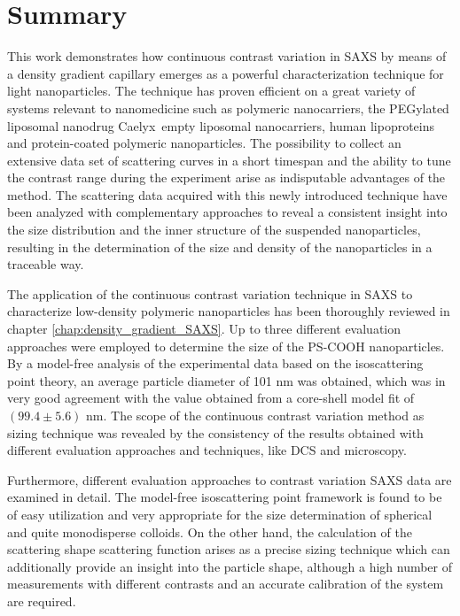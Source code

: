 \chapter{Summary} 
\label{chap:conclusions}
This work demonstrates how continuous contrast variation in SAXS by means of a density gradient capillary emerges as a powerful characterization technique for light nanoparticles. The technique has proven efficient on a great variety of systems relevant to nanomedicine such as polymeric nanocarriers, the PEGylated liposomal nanodrug Caelyx\textregistered\, empty liposomal nanocarriers, human lipoproteins and protein-coated polymeric nanoparticles. The possibility to collect an extensive data set of scattering curves in a short timespan and the ability to tune the contrast range during the experiment arise as indisputable advantages of the method. The scattering data acquired with this newly introduced technique have been analyzed with complementary approaches to reveal a consistent insight into the size distribution and the inner structure of the suspended nanoparticles, resulting in the determination of the size and density of the nanoparticles in a traceable way. 

The application of the continuous contrast variation technique in SAXS to characterize low-density polymeric nanoparticles has been thoroughly reviewed in chapter \ref{chap:density_gradient_SAXS}. Up to three different evaluation approaches were employed to determine the size of the PS-COOH nanoparticles. By a model-free analysis of the experimental data based on the isoscattering point theory, an average particle diameter of 101 nm was obtained, which was in very good agreement with the value obtained from a core-shell model fit of $\left( 99.4 \pm 5.6  \right)$ nm. The scope of the continuous contrast variation method as sizing technique was revealed by the consistency of the results obtained with different evaluation approaches and techniques, like DCS and microscopy.

Furthermore, different evaluation approaches to contrast variation SAXS data are examined in detail. The model-free isoscattering point framework is found to be of easy utilization and very appropriate for the size determination of spherical and quite monodisperse colloids. On the other hand, the calculation of the scattering shape scattering function arises as a precise sizing technique which can additionally provide an insight into the particle shape, although a high number of measurements with different contrasts and an accurate calibration of the system are required.

